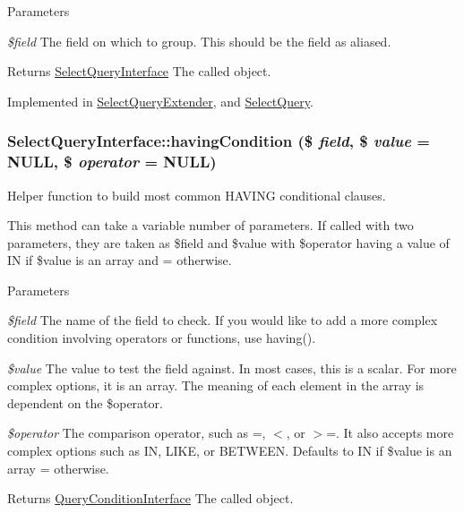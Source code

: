 \begin{DoxyParams}{Parameters}
\item[{\em \$field}]The field on which to group. This should be the field as aliased. \end{DoxyParams}
\begin{DoxyReturn}{Returns}
\hyperlink{interfaceSelectQueryInterface}{SelectQueryInterface} The called object. 
\end{DoxyReturn}


Implemented in \hyperlink{classSelectQueryExtender_aa51fb0b6bc8b2484b52328f1109d1a48}{SelectQueryExtender}, and \hyperlink{classSelectQuery_aadcd66d052ac3e3f1fc2eb1490cdade7}{SelectQuery}.\hypertarget{interfaceSelectQueryInterface_a5b33d0a9d60cb31a705d590ae1cf8bef}{
\subsubsection[{havingCondition}]{\setlength{\rightskip}{0pt plus 5cm}SelectQueryInterface::havingCondition (\$ {\em field}, \/  \$ {\em value} = {\ttfamily NULL}, \/  \$ {\em operator} = {\ttfamily NULL})}}
\label{interfaceSelectQueryInterface_a5b33d0a9d60cb31a705d590ae1cf8bef}
Helper function to build most common HAVING conditional clauses.

This method can take a variable number of parameters. If called with two parameters, they are taken as \$field and \$value with \$operator having a value of IN if \$value is an array and = otherwise.


\begin{DoxyParams}{Parameters}
\item[{\em \$field}]The name of the field to check. If you would like to add a more complex condition involving operators or functions, use having(). \item[{\em \$value}]The value to test the field against. In most cases, this is a scalar. For more complex options, it is an array. The meaning of each element in the array is dependent on the \$operator. \item[{\em \$operator}]The comparison operator, such as =, $<$, or $>$=. It also accepts more complex options such as IN, LIKE, or BETWEEN. Defaults to IN if \$value is an array = otherwise. \end{DoxyParams}
\begin{DoxyReturn}{Returns}
\hyperlink{interfaceQueryConditionInterface}{QueryConditionInterface} The called object. 
\end{DoxyReturn}


